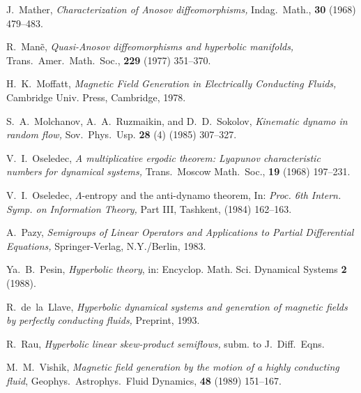 \begin{thebibliography}{99}
 J.~Mather,
{\em Characterization of Anosov diffeomorphisms,}
Indag.~Math., {\bf 30} (1968) 479--483.

 R.~Man\~e,
{\em Quasi-Anosov diffeomorphisms and hyperbolic manifolds,}
Trans.~Amer.~Math.~Soc., {\bf 229} (1977) 351--370.

 H.~K.~Moffatt,
{\em Magnetic Field Generation in
Electrically Conducting Fluids,} Cambridge Univ. Press, Cambridge,
1978.

 S.~A.~Molchanov, A.~A.~Ruzmaikin, and D.~D.~Sokolov,
{\em Kinematic dynamo in random flow,} Sov.~Phys.~Usp. {\bf 28} (4)
(1985) 307--327.

  V.~I.~Oseledec,
{\em A multiplicative ergodic
theorem: Lyapunov characteristic numbers for dynamical systems,}
Trans.~Moscow Math.~Soc., {\bf 19} (1968) 197--231.


 V.~I.~Oseledec, $\Lambda$-entropy and the anti-dynamo
theorem, In: {\it Proc. 6th Intern. Symp. on Information Theory,}
Part III, Tashkent, (1984) 162--163.

 A.~Pazy,
{\em Semigroups of Linear Operators and Applications
to Partial Differential Equations,}
Springer-Verlag, N.Y./Berlin, 1983.

 Ya.~B.~Pesin, {\em Hyperbolic theory}, in: Encyclop. Math. Sci.
Dynamical Systems {\bf 2} (1988).

  R.~de~la~Llave,
{\em Hyperbolic dynamical systems and
generation of magnetic fields by perfectly conducting fluids,}
Preprint, 1993.

  R.~Rau,
{\em Hyperbolic linear skew-product semiflows,}
subm. to J.~Diff.~Eqns.

 M.~M.~Vishik,
{\em Magnetic field generation by the motion of
a highly conducting fluid},
Geophys.~Astrophys.~Fluid Dynamics,
{\bf 48} (1989) 151--167.

\end{thebibliography}






